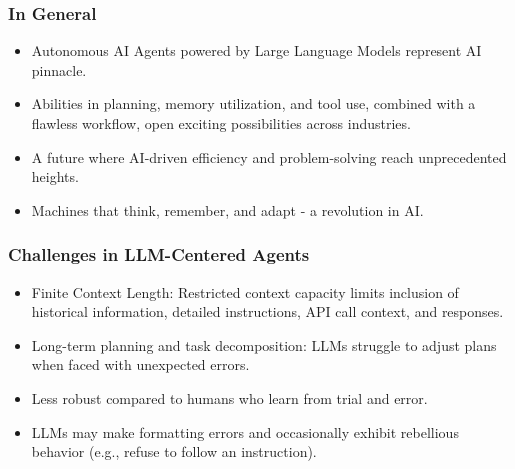 \begin{frame}[fragile]\frametitle{In General}
  \begin{itemize}
    \item Autonomous AI Agents powered by Large Language Models represent AI pinnacle.
    \item Abilities in planning, memory utilization, and tool use, combined with a flawless workflow, open exciting possibilities across industries.
    \item A future where AI-driven efficiency and problem-solving reach unprecedented heights.
    \item Machines that think, remember, and adapt - a revolution in AI.
  \end{itemize}
\end{frame}


\begin{frame}[fragile]\frametitle{Challenges in LLM-Centered Agents}
  \begin{itemize}

    \item Finite Context Length: Restricted context capacity limits inclusion of historical information, detailed instructions, API call context, and responses.
    \item Long-term planning and task decomposition: LLMs struggle to adjust plans when faced with unexpected errors.
    \item Less robust compared to humans who learn from trial and error.
    \item LLMs may make formatting errors and occasionally exhibit rebellious behavior (e.g., refuse to follow an instruction).
  \end{itemize}
\end{frame}

